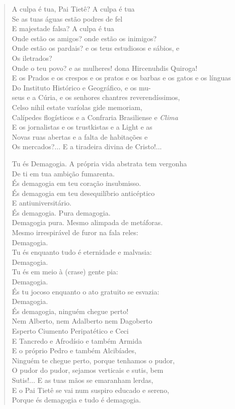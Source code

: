 \begin{verse}
A culpa é tua, Pai Tietê? A culpa é tua\\
Se as tuas águas estão podres de fel\\
E majestade falsa? A culpa é tua\\
Onde estão os amigos? onde estão os inimigos?\\
Onde estão os pardais? e os teus estudiosos e sábios, e\\
Os iletrados?\\
Onde o teu povo? e as mulheres! dona Hircenuhdis Quiroga!\\
E os Prados e os crespos e os pratos e os barbas e os gatos e os línguas\\
Do Instituto Histórico e Geográfico, e os mu-\\
seus e a Cúria, e os senhores chantres reverendíssimos,\\
Celso nihil estate varíolas gide memoriam,\\
Calípedes flogísticos e a Confraria Brasiliense e \emph{Clima}\\
E os jornalistas e os trustkistas e a Light e as\\
Novas ruas abertas e a falta de habitações e\\
Os mercados?... E a tiradeira divina de Cristo!...

Tu és Demagogia. A própria vida abstrata tem vergonha\\
De ti em tua ambição fumarenta.\\
És demagogia em teu coração insubmisso.\\
És demagogia em teu desequilíbrio anticéptico\\
E antiuniversitário.\\
És demagogia. Pura demagogia.\\
Demagogia pura. Mesmo alimpada de metáforas.\\
Mesmo irrespirável de furor na fala reles:\\
Demagogia.\\
Tu és enquanto tudo é eternidade e malvasia:\\
Demagogia.\\
Tu és em meio à (crase) gente pia:\\
Demagogia.\\
És tu jocoso enquanto o ato gratuito se esvazia:\\
Demagogia.\\
És demagogia, ninguém chegue perto!\\
Nem Alberto, nem Adalberto nem Dagoberto\\
Esperto Ciumento Peripatético e Ceci\\
E Tancredo e Afrodísio e também Armida\\
E o próprio Pedro e também Alcibíades,\\
Ninguém te chegue perto, porque tenhamos o pudor,\\
O pudor do pudor, sejamos verticais e sutis, bem\\
Sutis!... E as tuas mãos se emaranham lerdas,\\
E o Pai Tietê se vai num suspiro educado e sereno,\\
Porque és demagogia e tudo é demagogia.


\end{verse}

